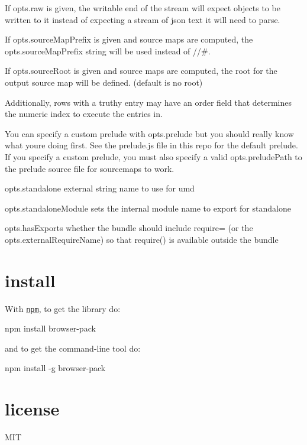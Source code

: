 If {\ttfamily opts.\+raw} is given, the writable end of the stream will expect objects to be written to it instead of expecting a stream of json text it will need to parse.

If {\ttfamily opts.\+source\+Map\+Prefix} is given and source maps are computed, the {\ttfamily opts.\+source\+Map\+Prefix} string will be used instead of {\ttfamily //\#}.

If {\ttfamily opts.\+source\+Root} is given and source maps are computed, the root for the output source map will be defined. (default is no root)

Additionally, rows with a truthy {\ttfamily entry} may have an {\ttfamily order} field that determines the numeric index to execute the entries in.

You can specify a custom prelude with {\ttfamily opts.\+prelude} but you should really know what you\textquotesingle{}re doing first. See the {\ttfamily prelude.\+js} file in this repo for the default prelude. If you specify a custom prelude, you must also specify a valid {\ttfamily opts.\+prelude\+Path} to the prelude source file for sourcemaps to work.

{\ttfamily opts.\+standalone} external string name to use for umd

{\ttfamily opts.\+standalone\+Module} sets the internal module name to export for standalone

{\ttfamily opts.\+has\+Exports} whether the bundle should include {\ttfamily require=} (or the {\ttfamily opts.\+external\+Require\+Name}) so that {\ttfamily require()} is available outside the bundle

\section*{install}

With \href{https://npmjs.org}{\tt npm}, to get the library do\+:


\begin{DoxyCode}
npm install browser-pack
\end{DoxyCode}


and to get the command-\/line tool do\+:


\begin{DoxyCode}
npm install -g browser-pack
\end{DoxyCode}


\section*{license}

M\+IT 